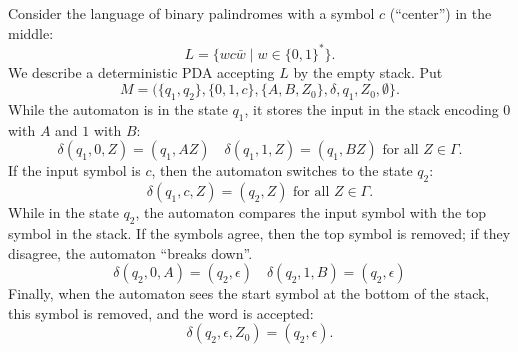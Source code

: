 

\setcounter{section}{6}
\setcounter{subsection}{1}
\setcounter{dfn}{3}

\begin{exl}
Consider the language of binary palindromes with a symbol $c$ (``center'') in the middle:
\[
L = \{w c \bar{w} \mid w \in \{0,1\}^*\}.
\]
We describe a deterministic PDA accepting $L$ by the empty stack. Put
\[
M = (\{q_1, q_2\}, \{0, 1, c\}, \{A, B, Z_0\}, \delta, q_1, Z_0, \emptyset\}.
\]
While the automaton is in the state $q_1$, it stores the input in the stack encoding $0$ with $A$ and $1$ with $B$:
\[
\delta(q_1, 0, Z) = (q_1, AZ) \quad \delta(q_1, 1, Z) = (q_1, BZ) \text{ for all }Z \in \Gamma.
\]
If the input symbol is $c$, then the automaton switches to the state $q_2$:
\[
\delta(q_1, c, Z) = (q_2, Z) \text{ for all }Z \in \Gamma.
\]
While in the state $q_2$, the automaton compares the input symbol with the top symbol in the stack.
If the symbols agree, then the top symbol is removed; if they disagree, the automaton ``breaks down''.
\[
\delta(q_2, 0, A) = (q_2, \epsilon) \quad \delta(q_2, 1, B) = (q_2, \epsilon)
\]
Finally, when the automaton sees the start symbol at the bottom of the stack, this symbol is removed, and the word is accepted:
\[
\delta(q_2, \epsilon, Z_0) = (q_2, \epsilon).
\]
\end{exl}


